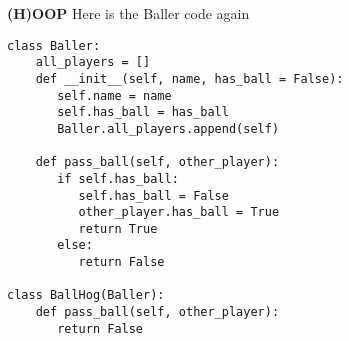 \begin{blocksection}
\question \textbf{(H)OOP} \newline
Here is the Baller code again

\begin{lstlisting}
class Baller:
    all_players = []
    def __init__(self, name, has_ball = False):
       self.name = name
       self.has_ball = has_ball
       Baller.all_players.append(self)
    
    def pass_ball(self, other_player):
       if self.has_ball:
          self.has_ball = False
          other_player.has_ball = True
          return True
       else:
          return False

class BallHog(Baller):
    def pass_ball(self, other_player):  
       return False 
       
\end{lstlisting}
\end{blocksection}